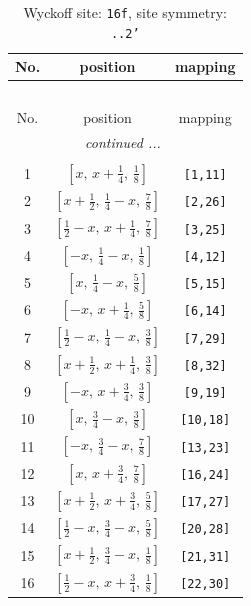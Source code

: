 \documentclass[fleqn,8pt]{jsarticle}
\begin{document}
\renewcommand{\arraystretch}{1.2}
\begin{longtable}{ccc}
\caption{Wyckoff site: {\tt 16f}, site symmetry: {\tt ..2'}}
 \\
 \hline \hline
No. & position & mapping \\ \hline \endfirsthead

\multicolumn{2}{l}{\tablename\ \thetable{}} \\
 \hline \hline
No. & position & mapping \\ \hline \endhead

 \hline \hline
\multicolumn{2}{r}{\footnotesize\it continued ...} \\ \endfoot

 \hline \hline
\multicolumn{2}{r}{} \\ \endlastfoot

1 & $\left[ x,\, x + \frac{1}{4},\, \frac{1}{8} \right]$ & {\tt [1,11]} \\ \hline
2 & $\left[ x + \frac{1}{2},\, \frac{1}{4} - x,\, \frac{7}{8} \right]$ & {\tt [2,26]} \\ \hline
3 & $\left[ \frac{1}{2} - x,\, x + \frac{1}{4},\, \frac{7}{8} \right]$ & {\tt [3,25]} \\ \hline
4 & $\left[ - x,\, \frac{1}{4} - x,\, \frac{1}{8} \right]$ & {\tt [4,12]} \\ \hline
5 & $\left[ x,\, \frac{1}{4} - x,\, \frac{5}{8} \right]$ & {\tt [5,15]} \\ \hline
6 & $\left[ - x,\, x + \frac{1}{4},\, \frac{5}{8} \right]$ & {\tt [6,14]} \\ \hline
7 & $\left[ \frac{1}{2} - x,\, \frac{1}{4} - x,\, \frac{3}{8} \right]$ & {\tt [7,29]} \\ \hline
8 & $\left[ x + \frac{1}{2},\, x + \frac{1}{4},\, \frac{3}{8} \right]$ & {\tt [8,32]} \\ \hline
9 & $\left[ - x,\, x + \frac{3}{4},\, \frac{3}{8} \right]$ & {\tt [9,19]} \\ \hline
10 & $\left[ x,\, \frac{3}{4} - x,\, \frac{3}{8} \right]$ & {\tt [10,18]} \\ \hline
11 & $\left[ - x,\, \frac{3}{4} - x,\, \frac{7}{8} \right]$ & {\tt [13,23]} \\ \hline
12 & $\left[ x,\, x + \frac{3}{4},\, \frac{7}{8} \right]$ & {\tt [16,24]} \\ \hline
13 & $\left[ x + \frac{1}{2},\, x + \frac{3}{4},\, \frac{5}{8} \right]$ & {\tt [17,27]} \\ \hline
14 & $\left[ \frac{1}{2} - x,\, \frac{3}{4} - x,\, \frac{5}{8} \right]$ & {\tt [20,28]} \\ \hline
15 & $\left[ x + \frac{1}{2},\, \frac{3}{4} - x,\, \frac{1}{8} \right]$ & {\tt [21,31]} \\ \hline
16 & $\left[ \frac{1}{2} - x,\, x + \frac{3}{4},\, \frac{1}{8} \right]$ & {\tt [22,30]} \\
\end{longtable}
\end{document}
